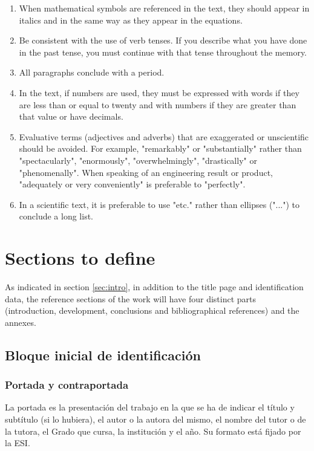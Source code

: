 \begin{enumerate}
\item When mathematical symbols are referenced in the text, they should appear in italics and in the same way as they appear in the equations.




\item Be consistent with the use of verb tenses.  If you describe what you have done in the past tense, you must continue with that tense throughout the memory.  




\item All paragraphs conclude with a period.

\item In the text, if numbers are used, they must be expressed with words if they are less than or equal to twenty and with numbers if they are greater than that value or have decimals.


\item  Evaluative terms (adjectives and adverbs) that are exaggerated or unscientific should be avoided. For example, "remarkably" or "substantially" rather than "spectacularly", "enormously", "overwhelmingly", "drastically" or "phenomenally". When speaking of an engineering result or product, "adequately or very conveniently" is preferable to "perfectly".

\item In a scientific text, it is preferable to use "etc." rather than ellipses ("...") to conclude a long list.



\end{enumerate}




 
 \chapter{Sections to define}
\label{sec:apartados}

As indicated in section \ref{sec:intro}, in addition to the title page and identification data, the reference sections of the work will have four distinct parts (introduction, development, conclusions and bibliographical references) and the annexes.

 \section{Bloque inicial de identificación}

 \subsection{Portada y contraportada}  
La portada es la presentación del trabajo en la que se ha de indicar el título y subtítulo (si  lo  hubiera),  el  autor  o  la  autora  del  mismo,  el  nombre  del  tutor  o  de  la  tutora,  el  Grado  que  cursa, la institución y el año. Su formato está fijado por la ESI.


